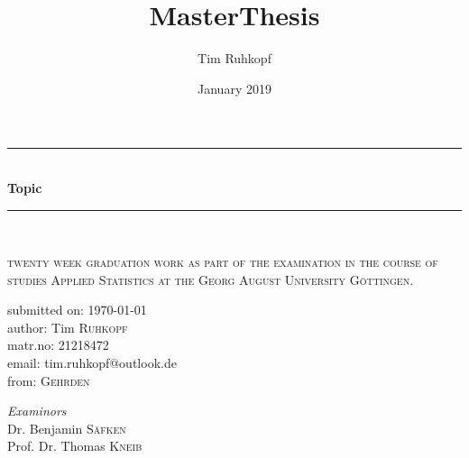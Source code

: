 \documentclass[11pt]{article}
\title{MasterThesis}
\author{Tim Ruhkopf}
\date{January 2019}
\begin{document}
\begin{titlepage}

	\newcommand{\HRule}{\rule{\linewidth}{0.5mm}}
	\center %

	\HRule\\[0.4cm]

	{\huge\bfseries Topic}\\[0.4cm]

	\HRule\\[1.5cm]
	\vfill\vfill

	\textsc{\Large twenty week graduation work as part of the examination in the course of studies Applied Statistics at the
        Georg August University G\"ottingen.}\\[1.5cm]

	\vfill\vfill
	\begin{minipage}{0.5\textwidth}
		\begin{center}
			\large
			submitted on: {\large\today} \\
		    author: Tim \textsc{Ruhkopf}\\
            matr.no: 21218472 \\
            email: tim.ruhkopf@outlook.de \\
			from: \textsc{Gehrden}\\

		\end{center}
	\end{minipage}

	\vfill\vfill

	\begin{minipage}{0.5\textwidth}
		\begin{center}
			\large
			\textit{Examinors}\\
			Dr. Benjamin \textsc{S\"afken}\\
			Prof. Dr. Thomas \textsc{Kneib}

		\end{center}
	\end{minipage}

	\vfill\vfill\vfill\vfill

\end{titlepage}

    \tableofcontents
    \thispagestyle{empty} %

    \clearpage
    \listoftables
    \listoffigures
    \listofalgorithms

    \clearpage
    \setcounter{page}{1} %
\end{document}
